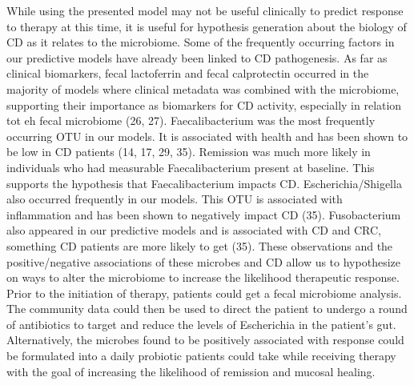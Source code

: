 \documentclass[11pt,]{article}
\begin{document}
While using the presented model may not be useful clinically to predict
response to therapy at this time, it is useful for hypothesis generation
about the biology of CD as it relates to the microbiome. Some of the
frequently occurring factors in our predictive models have already been
linked to CD pathogenesis. As far as clinical biomarkers, fecal
lactoferrin and fecal calprotectin occurred in the majority of models
where clinical metadata was combined with the microbiome, supporting
their importance as biomarkers for CD activity, especially in relation
tot eh fecal microbiome (26, 27). Faecalibacterium was the most
frequently occurring OTU in our models. It is associated with health and
has been shown to be low in CD patients (14, 17, 29, 35). Remission was
much more likely in individuals who had measurable Faecalibacterium
present at baseline. This supports the hypothesis that Faecalibacterium
impacts CD. Escherichia/Shigella also occurred frequently in our models.
This OTU is associated with inflammation and has been shown to
negatively impact CD (35). Fusobacterium also appeared in our predictive
models and is associated with CD and CRC, something CD patients are more
likely to get (35). These observations and the positive/negative
associations of these microbes and CD allow us to hypothesize on ways to
alter the microbiome to increase the likelihood therapeutic response.
Prior to the initiation of therapy, patients could get a fecal
microbiome analysis. The community data could then be used to direct the
patient to undergo a round of antibiotics to target and reduce the
levels of Escherichia in the patient's gut. Alternatively, the microbes
found to be positively associated with response could be formulated into
a daily probiotic patients could take while receiving therapy with the
goal of increasing the likelihood of remission and mucosal healing.
\end{document}
